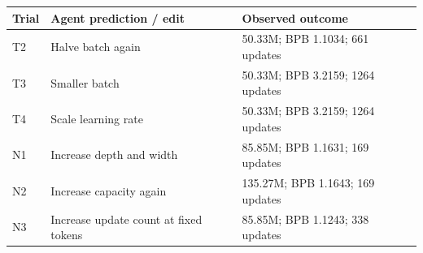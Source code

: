 \begin{tabular}{lp{2.6in}p{1.7in}}
\toprule
Trial & Agent prediction / edit & Observed outcome \\
\midrule
T2 & Halve batch again & 50.33M; BPB 1.1034; 661 updates \\
T3 & Smaller batch & 50.33M; BPB 3.2159; 1264 updates \\
T4 & Scale learning rate & 50.33M; BPB 3.2159; 1264 updates \\
N1 & Increase depth and width & 85.85M; BPB 1.1631; 169 updates \\
N2 & Increase capacity again & 135.27M; BPB 1.1643; 169 updates \\
N3 & Increase update count at fixed tokens & 85.85M; BPB 1.1243; 338 updates \\
\bottomrule
\end{tabular}

